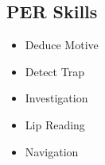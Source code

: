 \documentclass[]{article}
\providecommand{\tightlist}{%
  \setlength{\itemsep}{0pt}\setlength{\parskip}{0pt}}
\begin{document}
\subsection{PER Skills}\label{per-skills}

\begin{itemize}
\tightlist
\item
  Deduce Motive
\item
  Detect Trap
\item
  Investigation
\item
  Lip Reading
\item
  Navigation
\end{itemize}
\end{document}
